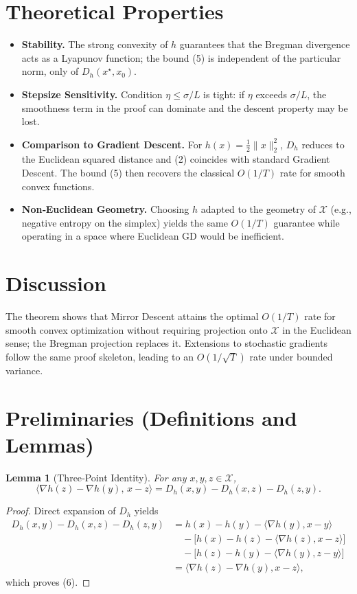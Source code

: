 \documentclass{article}
\newtheorem{lemma}{Lemma}
\begin{document}
\section*{Theoretical Properties}
\begin{itemize}
\item \textbf{Stability.} The strong convexity of $h$ guarantees that the Bregman divergence acts as a Lyapunov function; the bound (5) is independent of the particular norm, only of $D_{h}(x^{\star},x_{0})$.
\item \textbf{Stepsize Sensitivity.} Condition $\eta\le\sigma/L$ is tight: if $\eta$ exceeds $\sigma/L$, the smoothness term in the proof can dominate and the descent property may be lost.
\item \textbf{Comparison to Gradient Descent.} For $h(x)=\tfrac12\|x\|_{2}^{2}$, $D_{h}$ reduces to the Euclidean squared distance and (2) coincides with standard Gradient Descent. The bound (5) then recovers the classical $O(1/T)$ rate for smooth convex functions.
\item \textbf{Non‑Euclidean Geometry.} Choosing $h$ adapted to the geometry of $\mathcal X$ (e.g., negative entropy on the simplex) yields the same $O(1/T)$ guarantee while operating in a space where Euclidean GD would be inefficient.
\end{itemize}

\section*{Discussion}
The theorem shows that Mirror Descent attains the optimal $O(1/T)$ rate for smooth convex optimization without requiring projection onto $\mathcal X$ in the Euclidean sense; the Bregman projection replaces it. Extensions to stochastic gradients follow the same proof skeleton, leading to an $O(1/\sqrt{T})$ rate under bounded variance.

\newpage
\section*{Preliminaries (Definitions and Lemmas)}
\begin{lemma}[Three‑Point Identity]\label{lem:three-point}
For any $x,y,z\in\mathcal X$,
\[
\langle\nabla h(z)-\nabla h(y),\,x-z\rangle
= D_{h}(x,y)-D_{h}(x,z)-D_{h}(z,y). \tag{6}
\]
\end{lemma}
\begin{proof}
Direct expansion of $D_{h}$ yields
\[
\begin{aligned}
D_{h}(x,y)-D_{h}(x,z)-D_{h}(z,y)
&=h(x)-h(y)-\langle\nabla h(y),x-y\rangle\\
&\quad -\big[h(x)-h(z)-\langle\nabla h(z),x-z\rangle\big]\\
&\quad -\big[h(z)-h(y)-\langle\nabla h(y),z-y\rangle\big]\\
&=\langle\nabla h(z)-\nabla h(y),x-z\rangle,
\end{aligned}
\]
which proves (6). \hfill\qedsymbol
\end{proof}
\end{document}
